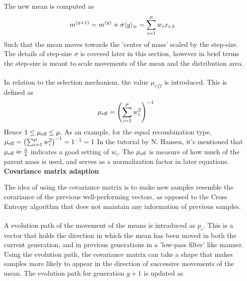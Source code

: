 The new mean is computed as
\begin{align}
m^{(g+1)} &= m^{(g)} + \sigma \langle y \rangle_{w} = \sum^{\mu}_{i = 1} w_{i}x_{i:\lambda} \label{eq:movemean}
\end{align}
Such that the mean moves towards the 'center of mass' scaled by the step-size.
The details of step-size $\sigma$ is covered later in this section,
however in brief terms the step-size is meant to scale movements 
of the mean and the distribution area.\\
\\
In relation to the selection mechanism, the value $\mu_{eff}$ is introduced.
This is defined as
\begin{align}
\mu_{\text{eff}} = \left( \sum_{i=1}^{\mu} w_i^2 \right)^{-1}
\end{align}
Hence $1 \leq \mu_{\text{eff}} \leq \mu$. As an example, for the equal recombination
type, $\mu_{\text{eff}} = \left( \sum_{i=1}^{\mu} w_i^2 \right)^{-1} = 1^{-1} =1$
In the tutorial by N. Hansen, it's mentioned that $\mu_{\text{eff}} \approx 
\frac{\lambda}{4}$ indicates a good setting of $w_i$. The $\mu_{\text{eff}}$ is 
measure of how much of the parent mass is used, and serves as a normalization 
factor in later equations.\\

\textbf{Covariance matrix adaption}

The idea of using the covariance matrix is to make new samples
resemble the covariance of the previous well-performing vectors, as opposed 
to the Cross Entropy algorithm that does not maintain any information of
previous samples.\\
\\
A evolution path of the movement of the means is introduced as $p_{c}$. This 
is a vector that holds the direction in which the mean has been moved in 
both the current generation, and in previous generations in 
a 'low-pass filter' like manner. Using the 
evolution path, the covariance matrix can take a shape that 
makes samples more likely to appear in the direction of successive 
movements of the mean.
The evolution path for generation $g+1$ is updated as

